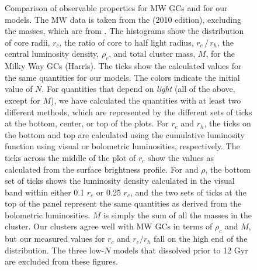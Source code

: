 \documentclass[12pt,preprint]{aastex}
\begin{document}


\begin{figure} [!ht]

	\caption{Comparison of observable properties for MW GCs and for our models. The MW data is taken from the \citealt{Harris1996} (2010 edition), excluding the masses, which are from \citealt{Gnedin1997}. The histograms show the distribution of core radii, $r_c$, the ratio of core to half light radius, $r_c\, /\, r_h$, the central luminosity density, $\rho_c$, and total cluster mass, $M$, for the Milky Way GCs (Harris). The ticks show the calculated values for the same quantities for our models. The colors indicate the initial value of $N$. For quantities that depend on \emph{light} (all of the above, except for $M$), we have calculated the quantities with at least two different methods, which are represented by the different sets of ticks at the bottom, center, or top of the plots. For $r_c$ and $r_h$, the ticks on the bottom and top are calculated using the cumulative luminosity function using visual or bolometric luminosities, respectively. The ticks across the middle of the plot of $r_c$ show the values as calculated from the surface brightness profile. For and $\rho$, the bottom set of ticks shows the luminosity density calculated in the visual band within either 0.1 $r_c$ or 0.25 $r_c$, and the two sets of ticks at the top of the panel represent the same quantities as derived from the bolometric luminosities. $M$ is simply the sum of all the masses in the cluster. Our clusters agree well with MW GCs in terms of $\rho_c$ and $M$, but our measured values for $r_c$ and $r_c / r_h$ fall on the high end of the distribution. The three low-$N$ models that dissolved prior to 12 Gyr are excluded from these figures.}

	\label{fig:MW_histograms}
\end{figure}

%
%
\end{document}

